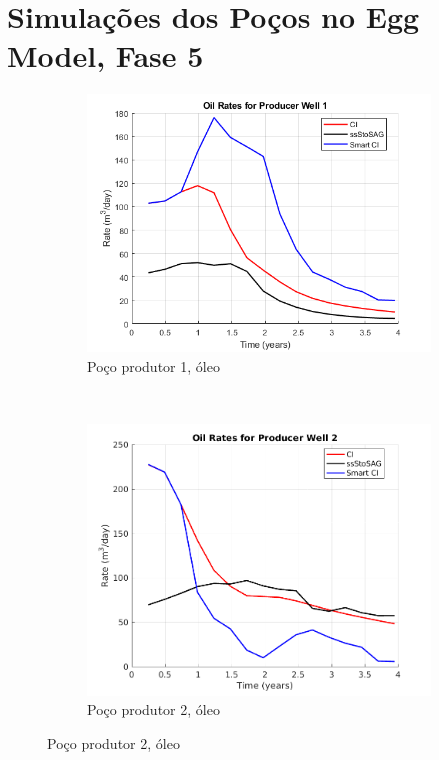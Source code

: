 \chapter{Simula\c{c}\~{o}es dos Po\c{c}os no Egg Model, Fase 5}\label{apn:egg5}

\begin{figure}[!ht]
	\centering
	\begin{subfigure}[b]{.3\textwidth}
		\includegraphics[width=\textwidth]{figs/resultadosEgg/imgsim5/EGG_OilWell1_Zoom}
		\caption{Po\c{c}o produtor 1, \'{o}leo}
		\label{EGG5_OilWell1}
	\end{subfigure}
	~
	\begin{subfigure}[b]{.3\textwidth}
		\includegraphics[width=\textwidth]{figs/resultadosEgg/imgsim5/EGG_OilWell2_Zoom}
		\caption{Po\c{c}o produtor 2, \'{o}leo}
		\label{EGG5_OilWell2}
	\end{subfigure}
	

\end{figure}
